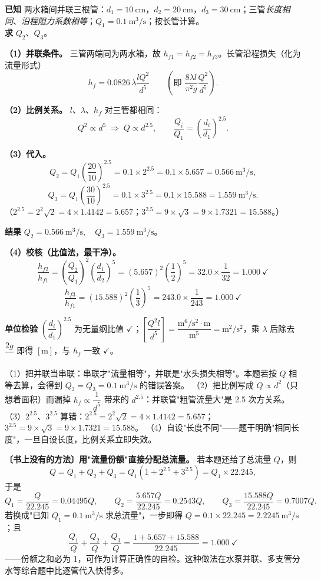 \begin{jie}
\textbf{已知} 两水箱间并联三根管：$d_1=10\ \mathrm{cm}$，$d_2=20\ \mathrm{cm}$，$d_3=30\ \mathrm{cm}$；三管\emph{长度相同}、\emph{沿程阻力系数相等}；$Q_1=0.1\ \mathrm{m^3/s}$；按长管计算。\\
\textbf{求} $Q_2$、$Q_3$。

\textbf{（1）并联条件。} 三管两端同为两水箱，故 $h_{f1}=h_{f2}=h_{f3}$。长管沿程损失（化为流量形式）
\[h_f=0.0826\,\lambda\frac{lQ^2}{d^5}\qquad\left(\text{即 }\frac{8\lambda l}{\pi^2g}\frac{Q^2}{d^5}\right).\]

\textbf{（2）比例关系。} $l$、$\lambda$、$h_f$ 对三管都相同：
\[Q^2\propto d^5\;\Longrightarrow\;Q\propto d^{2.5},\qquad
\frac{Q_i}{Q_1}=\left(\frac{d_i}{d_1}\right)^{2.5}.\]

\textbf{（3）代入。}
\[Q_2=Q_1\left(\frac{20}{10}\right)^{2.5}=0.1\times2^{2.5}=0.1\times5.657=0.566\ \mathrm{m^3/s},\]
\[Q_3=Q_1\left(\frac{30}{10}\right)^{2.5}=0.1\times3^{2.5}=0.1\times15.588=1.559\ \mathrm{m^3/s}.\]
（$2^{2.5}=2^2\sqrt{2}=4\times1.4142=5.657$；$3^{2.5}=9\times\sqrt3=9\times1.7321=15.588$。）

\textbf{结果} $\boxed{Q_2=0.566\ \mathrm{m^3/s},\quad Q_3=1.559\ \mathrm{m^3/s}}$。

\textbf{（4）校核（比值法，最干净）。}
\[\frac{h_{f2}}{h_{f1}}=\left(\frac{Q_2}{Q_1}\right)^2\left(\frac{d_1}{d_2}\right)^5=(5.657)^2\left(\frac{1}{2}\right)^5=32.0\times\frac{1}{32}=1.000\ \checkmark\]
\[\frac{h_{f3}}{h_{f1}}=(15.588)^2\left(\frac{1}{3}\right)^5=243.0\times\frac{1}{243}=1.000\ \checkmark\]

\textbf{单位检验} $\left(\dfrac{d_i}{d_1}\right)^{2.5}$ 为无量纲比值 $\checkmark$；$\left[\dfrac{Q^2l}{d^5}\right]=\dfrac{\mathrm{m^6/s^2}\cdot\mathrm{m}}{\mathrm{m^5}}=\mathrm{m^2/s^2}$，乘 $\lambda$ 后除去 $\dfrac{2g}{}$ 即得 $[\mathrm{m}]$，与 $h_f$ 一致 $\checkmark$。
\end{jie}
\begin{yicuo}
（1）把并联当串联：串联才"流量相等"，并联是"水头损失相等"。本题若按 $Q$ 相等去算，会得到 $Q_2=Q_3=0.1\ \mathrm{m^3/s}$ 的错误答案。
（2）把比例写成 $Q\propto d^2$（只想着面积）而漏掉 $h_f\propto\dfrac{1}{d^5}$ 带来的 $d^{2.5}$：并联管"粗管流量大"是 2.5 次方关系。
（3）$2^{2.5}$、$3^{2.5}$ 算错：$2^{2.5}=2^2\sqrt2=4\times1.4142=5.657$；$3^{2.5}=9\times\sqrt3=9\times1.7321=15.588$。
（4）自设"长度不同"——题干明确"相同长度"，一旦自设长度，比例关系立即失效。
\end{yicuo}
\begin{banfa}
\textbf{〔书上没有的方法〕用"流量份额"直接分配总流量。} 若本题还给了总流量 $Q$，则
\[Q=Q_1+Q_2+Q_3=Q_1\left(1+2^{2.5}+3^{2.5}\right)=Q_1\times22.245,\]
于是
\[Q_1=\frac{Q}{22.245}=0.04495Q,\qquad Q_2=\frac{5.657Q}{22.245}=0.2543Q,\qquad Q_3=\frac{15.588Q}{22.245}=0.7007Q.\]
若换成"已知 $Q_1=0.1\ \mathrm{m^3/s}$ 求总流量"，一步即得 $Q=0.1\times22.245=2.2245\ \mathrm{m^3/s}$；且
\[\frac{Q_1}{Q}+\frac{Q_2}{Q}+\frac{Q_3}{Q}=\frac{1+5.657+15.588}{22.245}=1.000\ \checkmark\]
——份额之和必为 1，可作为计算正确性的自检。这种做法在水泵并联、多支管分水等综合题中比逐管代入快得多。
\end{banfa}

